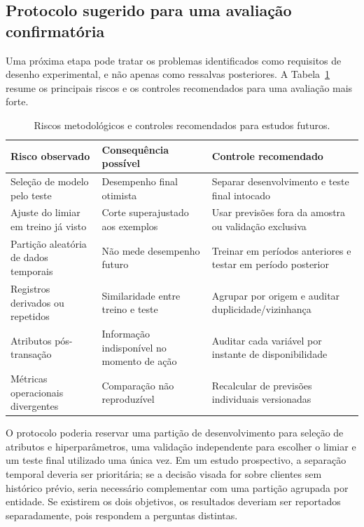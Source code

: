 \documentclass[11pt,a4paper]{article}
\begin{document}
\subsection{Protocolo sugerido para uma avaliação confirmatória}

Uma próxima etapa pode tratar os problemas identificados como requisitos de desenho experimental, e não apenas como ressalvas posteriores. A Tabela~\ref{tab:protocolo-futuro} resume os principais riscos e os controles recomendados para uma avaliação mais forte.

\begin{table}[htbp]
    \centering
    \caption{Riscos metodológicos e controles recomendados para estudos futuros.}\label{tab:protocolo-futuro}%
    \small
    \begin{tabular}{>{\raggedright\arraybackslash}p{3.6cm}>{\raggedright\arraybackslash}p{4.4cm}>{\raggedright\arraybackslash}p{5.1cm}}
        \toprule
        \textbf{Risco observado} & \textbf{Consequência possível} & \textbf{Controle recomendado} \\
        \midrule
        Seleção de modelo pelo teste & Desempenho final otimista & Separar desenvolvimento e teste final intocado \\
        Ajuste do limiar em treino já visto & Corte superajustado aos exemplos & Usar previsões fora da amostra ou validação exclusiva \\
        Partição aleatória de dados temporais & Não mede desempenho futuro & Treinar em períodos anteriores e testar em período posterior \\
        Registros derivados ou repetidos & Similaridade entre treino e teste & Agrupar por origem e auditar duplicidade/vizinhança \\
        Atributos pós-transação & Informação indisponível no momento de ação & Auditar cada variável por instante de disponibilidade \\
        Métricas operacionais divergentes & Comparação não reproduzível & Recalcular de previsões individuais versionadas \\
        \bottomrule
    \end{tabular}
\end{table}

O protocolo poderia reservar uma partição de desenvolvimento para seleção de atributos e hiperparâmetros, uma validação independente para escolher o limiar e um teste final utilizado uma única vez. Em um estudo prospectivo, a separação temporal deveria ser prioritária; se a decisão visada for sobre clientes sem histórico prévio, seria necessário complementar com uma partição agrupada por entidade. Se existirem os dois objetivos, os resultados deveriam ser reportados separadamente, pois respondem a perguntas distintas.
\end{document}
